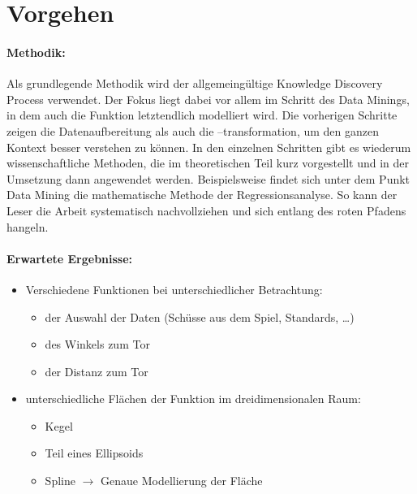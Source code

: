 \section{Vorgehen}

\paragraph{Methodik:}
Als grundlegende Methodik wird der allgemeingültige Knowledge Discovery Process verwendet. 
Der Fokus liegt dabei vor allem im Schritt des Data Minings, in dem auch die Funktion letztendlich modelliert wird. Die vorherigen Schritte zeigen die Datenaufbereitung als auch die –transformation, um den ganzen Kontext besser verstehen zu können. In den einzelnen Schritten gibt es wiederum wissenschaftliche Methoden, die im theoretischen Teil kurz vorgestellt und in der Umsetzung dann angewendet werden. Beispielsweise findet sich unter dem Punkt Data Mining die mathematische Methode der Regressionsanalyse. So kann der Leser die Arbeit systematisch nachvollziehen und sich entlang des roten Pfadens hangeln. 

\paragraph{Erwartete Ergebnisse:}
\begin{itemize}
\item Verschiedene Funktionen bei unterschiedlicher Betrachtung:
\begin{itemize}
\item der Auswahl der Daten (Schüsse aus dem Spiel, Standards, …)
\item des Winkels zum Tor
\item der Distanz zum Tor
\end{itemize}
\item unterschiedliche Flächen der Funktion im dreidimensionalen Raum:
\begin{itemize}
\item Kegel
\item Teil eines Ellipsoids
\item Spline $\rightarrow$ Genaue Modellierung der Fläche
\end{itemize}
\end{itemize}

